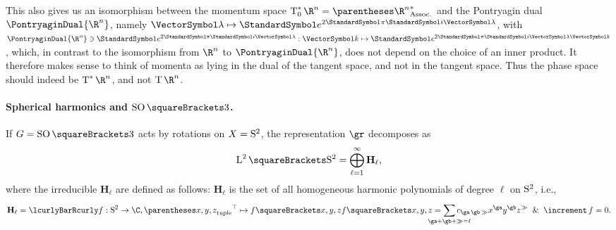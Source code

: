 \documentclass[10pt, a4paper, twoside]{lecturenotes}
\newcommand{\Rn}{{\R^n}}
\begin{document}
\begin{supplemental}
This also gives us an isomorphism between the momentum space $\CotangentSpace 0 \Rn = \Dual{\pa\Rn}$ and the Pontryagin dual $\PontryaginDual \Rn$, namely $\FunctionBody \vgl {\E^{2 \Pi \I \vgl }}$, with $\PontryaginDual \Rn\owns\FunctionNamedBody{\E^{2 \Pi \I \vgl}} \vk {\E^{2 \Pi \I \vgl\vk}}$, which, in contrast to the isomorphism from $\Rn$ to $\PontryaginDual\Rn$, does not depend on the choice of an inner product. It therefore makes sense to think of momenta as lying in the dual of the tangent space, and not in the tangent space. Thus the phase space should indeed be $\CotangentBundle \Rn$, and not $\TangentBundle \Rn$.

\paragraph{Spherical harmonics and $\SpecialOrthogonalGroup\of 3$.} 
\newcommand{\degL}{\ell}
\newcommand{\Harmonic}[1]{\mathbf{H}_{#1}}
If $G=\SpecialOrthogonalGroup\of 3$ acts by rotations on $X=\mathrm{S}^{2}$, the representation $\gr$ decomposes as 
\begin{equation*}
\Lspace[2]\of{\UnitSphere 2} = \DirectSumOver{\degL=1}[\infty] \Harmonic\degL\text{,}
\end{equation*}
where the irreducible $\Harmonic\degL$ are defined as follows: $\Harmonic\degL$ is the set of all homogeneous harmonic polynomials of degree $\degL$ on $\mathrm{S}^{2}$, i.e.,
\begin{equation*}
\Harmonic\degL = \setst{\FunctionSpec f {\UnitSphere 2} \C, \FunctionBody {\Transpose{\tuple{x,y,z}}} {f\of{x,y,z}}}{f\of{x,y,z} = \sum {\ga+\gb+\gg = \degL} c_{\ga\,\gb\,\gg} x^{\ga}y^{\gb}z^{\gg} \And \Laplacian f = 0  }\text{.}
\end{equation*}
\endgroup
\end{supplemental}
\end{document}
